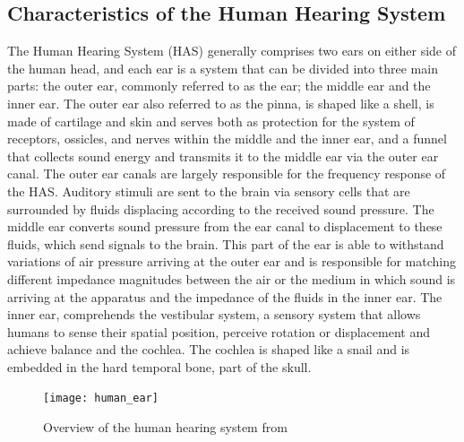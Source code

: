 \subsection{Characteristics of the Human Hearing System}
The Human Hearing System (HAS) generally comprises two ears on either side of the human head, and each ear is a system that can be divided into three main parts: the outer ear, commonly referred to as the ear; the middle ear and the inner ear. The outer ear also referred to as the pinna, is shaped like a shell, is made of cartilage and skin and serves both as protection for the system of receptors, ossicles, and nerves within the middle and the inner ear, and a funnel that collects sound energy and transmits it to the middle ear via the outer ear canal. The outer ear canals are largely responsible for the frequency response of the HAS. 
Auditory stimuli are sent to the brain via sensory cells that are surrounded by fluids displacing according to the received sound pressure. The middle ear converts sound pressure from the ear canal to displacement to these fluids, which send signals to the brain. This part of the ear is able to withstand variations of air pressure arriving at the outer ear and is responsible for matching different impedance magnitudes between the air or the medium in which sound is arriving at the apparatus and the impedance of the fluids in the inner ear.
The inner ear, comprehends the vestibular system, a sensory system that allows humans to sense their spatial position, perceive rotation or displacement and achieve balance and the cochlea. The cochlea is shaped like a snail and is embedded in the hard temporal bone, part of the skull.
\begin{figure}
    \centering
    \texttt{[image: human\_ear]}
    \caption[Overview of the human hearing system]{Overview of the human hearing system from \cite{zwicker2013psychoacoustics}}
    \label{fig:human_hearing_system}
\end{figure}

\cite{zwicker2013psychoacoustics}


